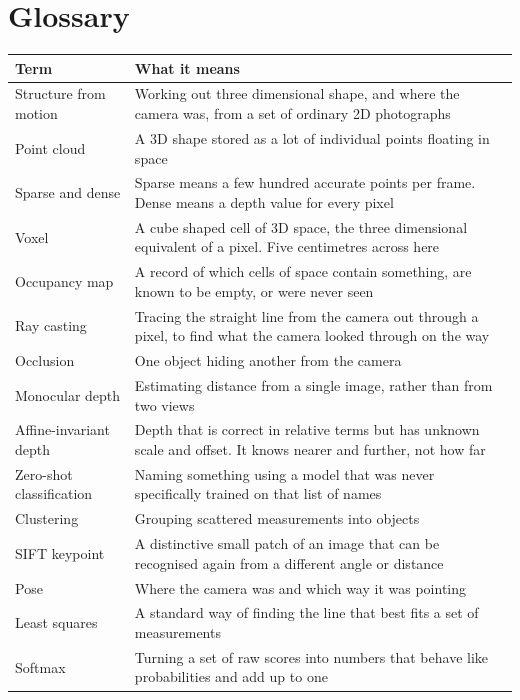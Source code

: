 \chapter{Glossary}

\begin{center}
\begin{tabular}{@{}p{}p{}@{}}
\toprule
\textbf{Term} & \textbf{What it means} \\
\midrule
Structure from motion & Working out three dimensional shape, and where the camera was, from a set of ordinary 2D photographs \\[4pt]
Point cloud & A 3D shape stored as a lot of individual points floating in space \\[4pt]
Sparse and dense & Sparse means a few hundred accurate points per frame. Dense means a depth value for every pixel \\[4pt]
Voxel & A cube shaped cell of 3D space, the three dimensional equivalent of a pixel. Five centimetres across here \\[4pt]
Occupancy map & A record of which cells of space contain something, are known to be empty, or were never seen \\[4pt]
Ray casting & Tracing the straight line from the camera out through a pixel, to find what the camera looked through on the way \\[4pt]
Occlusion & One object hiding another from the camera \\[4pt]
Monocular depth & Estimating distance from a single image, rather than from two views \\[4pt]
Affine-invariant depth & Depth that is correct in relative terms but has unknown scale and offset. It knows nearer and further, not how far \\[4pt]
Zero-shot classification & Naming something using a model that was never specifically trained on that list of names \\[4pt]
Clustering & Grouping scattered measurements into objects \\[4pt]
SIFT keypoint & A distinctive small patch of an image that can be recognised again from a different angle or distance \\[4pt]
Pose & Where the camera was and which way it was pointing \\[4pt]
Least squares & A standard way of finding the line that best fits a set of measurements \\[4pt]
Softmax & Turning a set of raw scores into numbers that behave like probabilities and add up to one \\
\bottomrule
\end{tabular}
\end{center}
